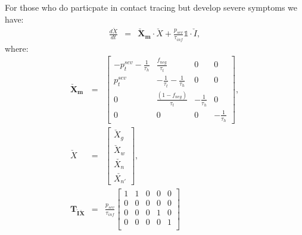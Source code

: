 \documentclass[notitlepage, superscriptaddress]{revtex4-2}
\begin{document}
For those who do particpate in contact tracing but develop severe symptoms we have:
\begin{eqnarray}
\frac{d\check{X}}{dt} &=& \boldsymbol{\check{X}_{m}} \cdot  \check{X} + \frac{p_{sev}}{\tau_{inf}} \mathbb{1} \cdot  \check{I}, 
\end{eqnarray}
where:
%
\begin{eqnarray}
\boldsymbol{\check{X}_{m}} &=&
\begin{bmatrix}
- p^{sev}_{t}   - \frac{1}{\tau_{h}}      &  \frac{f_{neg}}{\tau_{t}}    & 0  & 0\\
p^{sev}_{t}                  &  -\frac{1}{\tau_{t}}  - \frac{1}{\tau_{h}}  & 0 & 0\\
0 & \frac{(1-f_{neg})}{\tau_{t}}  &  -  \frac{1}{\tau_{h}} & 0 \\ 
0 & 0 & 0 &  -  \frac{1}{\tau_{h}}
\end{bmatrix}, \\ 
%
\check{X} &=& 
\begin{bmatrix}
\check{X}_{g} \\  \check{X}_{w}\\ \check{X_{n}} \\ \check{X_{n'}}
\end{bmatrix}, \\ 
%
\boldsymbol{T_{\check{I}\check{X}}} &=& \frac{p_{sev}}{\tau_{inf}}
\begin{bmatrix}
1  & 1 & 0 & 0 & 0 \\ 
0  & 0 & 0 & 0 & 0 \\ 
0  & 0 & 0 & 1 & 0 \\ 
0  & 0 & 0 & 0 & 1 \\ 
\end{bmatrix}
\end{eqnarray}
\end{document}
